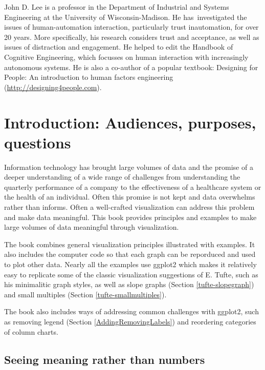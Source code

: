 \documentclass[]{krantz}
\begin{document}
John D. Lee is a professor in the Department of Industrial and Systems Engineering at the University of Wisconsin-Madison. He has~investigated the issues of human-automation interaction, particularly trust inautomation, for over 20 years. More specifically, his research considers trust and acceptance, as well as issues of distraction and engagement. He helped to edit the Handbook of Cognitive Engineering, which focusses on human interaction with increasingly autonomous systems. He is also a co-author of a popular textbook: Designing for People: An introduction to human factors engineering (\url{http://designing4people.com}).

\cleardoublepage

\hypertarget{Introduction}{%
\chapter{Introduction: Audiences, purposes, questions}\label{Introduction}}

Information technology has brought large volumes of data and the promise of a deeper understanding of a wide range of challenges from understanding the quarterly performance of a company to the effectiveness of a healthcare system or the health of an individual. Often this promise is not kept and data overwhelms rather than informs. Often a well-crafted visualization can address this problem and make data meaningful. This book provides principles and examples to make large volumes of data meaningful through visualization.

The book combines general visualization principles illustrated with examples. It also includes the computer code so that each graph can be reporduced and used to plot other data. Nearly all the examples use ggplot2 which makes it relatively easy to replicate some of the classic visualization suggestions of E. Tufte, such as his minimalitic graph styles, as well as slope graphs (Section \ref{tufte-slopegraph}) and small multiples (Section \ref{tufte-smallmultiples}).

The book also includes ways of addressing common challenges with ggplot2, such as removing legend (Section \ref{AddingRemovingLabels}) and reordering categories of column charts.

\hypertarget{seeing-meaning-rather-than-numbers}{%
\section{Seeing meaning rather than numbers}\label{seeing-meaning-rather-than-numbers}}
\end{document}
